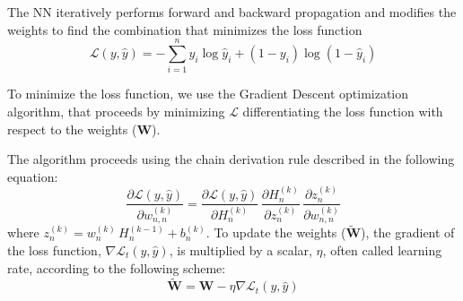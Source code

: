 \documentclass[12pt]{beamer}
\begin{document}
\begin{frame}
	\scriptsize
The NN iteratively performs forward and backward propagation and modifies the weights to find the combination that minimizes the loss function	$$\mathcal{L}(y,\hat{y})=-\sum_{i=1}^{n} y_{i} \log \hat{y}_{i}+\left(1-y_{i}\right) \log \left(1-\hat{y}_{i}\right)$$

To minimize the loss function, we use the Gradient Descent optimization algorithm, that proceeds by minimizing $\mathcal{L}$ differentiating the loss function with respect to the weights  ($\mathbf{{W}}$).

The algorithm proceeds using the chain derivation rule described in the following equation:
\begin{equation}
	\frac{\partial \mathcal{L}(y,\hat{y})}{\partial w_{n,n}^{(k)}} =\frac{\partial \mathcal{L}(y,\hat{y})}{\partial H_n^{(k)}}\,\frac{{\partial H_n^{(k)}}}{\partial z_n^{(k)}} \, \frac{\partial z_n^{(k)}}{\partial w_{n,n}^{(k)}}
\end{equation}
where $ z_n^{(k)}=w_{n}^{(k)}\,H_{n}^{(k-1)}+b_n^{(k)}$. 
To update the weights ($\mathbf{\tilde{W}}$), the gradient of the loss function, $\nabla \mathcal{L}_t(y,\hat{y})$, is multiplied by a scalar, $\eta$, often called learning rate, according to the following scheme:
	\begin{equation}
	\mathbf{\tilde{W}}=\mathbf{W}-\eta \nabla \mathcal{L}_t(y,\hat{y})
\end{equation}
\end{frame}
\end{document}
